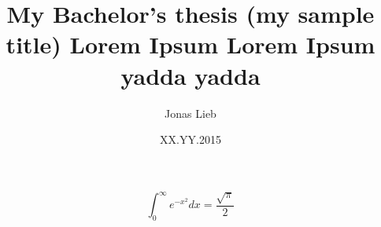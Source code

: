\documentclass{article}
\title{My Bachelor's thesis (my sample title) Lorem Ipsum Lorem Ipsum yadda yadda}
\date{XX.YY.2015}
\author{Jonas Lieb}
\begin{document}

\newpage

\blinddocument

\[ \int_0^\infty e^{-x^2} dx=\frac{\sqrt{\pi}}{2} \]
\end{document}
